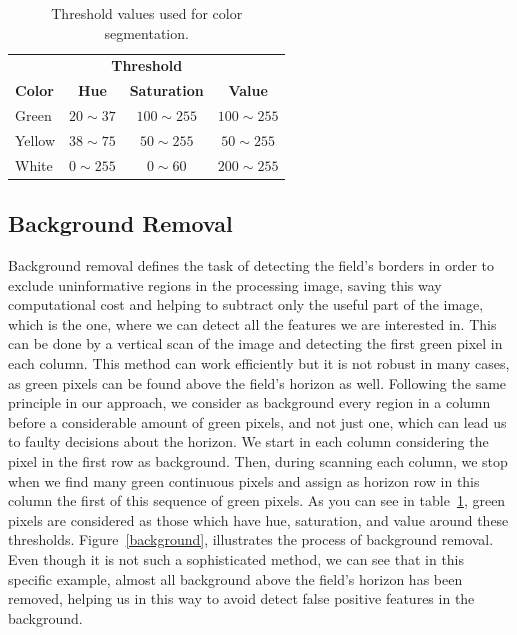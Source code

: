 \documentclass[	DIV=calc,%
							paper=a4,%
							fontsize=9pt,%
							twocolumn]{scrartcl}	 					%
\begin{document}
\begin{table}
\begin{center}
\caption{Threshold values used for color segmentation.}
\label{thresholdHSV}
\begin{tabular}{lccc}
\toprule
\multicolumn{4}{c}{\textbf{Threshold}} \\
\cmidrule(r){2-4}
\textbf{Color}   & \textbf{Hue} & \textbf{Saturation} & \textbf{Value} \\
\midrule
Green      & $20 \sim 37$    & $100 \sim 255$    & $100 \sim 255$    \\
Yellow      & $38 \sim 75$    & $50 \sim 255$    & $50 \sim 255$    \\
White     & $0 \sim 255$    & $0 \sim 60$    & $200 \sim 255$    \\
\bottomrule
\end{tabular}
\end{center}
\end{table}

\subsection{Background Removal}
Background removal defines the task of detecting the field's borders in order to exclude uninformative regions in the processing image, saving this way computational cost and helping to subtract only the useful part of the image, which is the one, where we can detect all the features we are interested in. This can be done by a vertical scan of the image and detecting the first green pixel in each column. This method can work efficiently but it is not robust in many cases, as green pixels can be found above the field's horizon as well. Following the same principle in our approach, we consider as background every region in a column before a considerable amount of green pixels, and not just one, which can lead us to faulty decisions about the horizon. We start in each column considering the pixel in the first row as background. Then, during scanning each column, we stop when we find many green continuous pixels and assign as horizon row in this column the first of this sequence of green pixels.  As you can see in table~\ref{thresholdHSV}, green pixels are considered as those which have hue, saturation, and value around these thresholds. Figure~\ref{background}, illustrates the process of background removal. Even though it is not such a sophisticated method, we can see that in this specific example, almost all background above the field's horizon has been removed, helping us in this way to avoid detect false positive features in the background.
\end{document}
